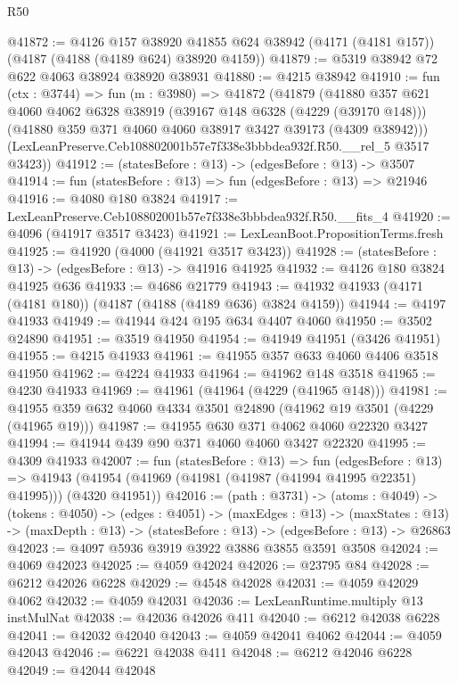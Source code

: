 \begin{lexlean}{R50}
\begin{coremodule}
@41872 := @4126
    @157
    @38920
    @41855
    @624
    @38942
    (@4171 (@4181 @157))
    (@4187 (@4188 (@4189 @624) @38920 @4159))
@41879 := @5319 @38942 @72 @622 @4063 @38924 @38920 @38931
@41880 := @4215 @38942
@41910 := fun (ctx : @3744) =>
  fun (m : @3980) =>
  @41872
    (@41879
      (@41880
        @357
        @621
        @4060
        @4062
        @6328
        @38919
        (@39167 @148 @6328 (@4229 (@39170 @148)))
        (@41880 @359 @371 @4060 @4060 @38917 @3427 @39173 (@4309 @38942)))
      (LexLeanPreserve.Ceb108802001b57e7f338e3bbbdea932f.R50.__rel_5 @3517 @3423))
@41912 := (statesBefore : @13) -> (edgesBefore : @13) -> @3507
@41914 := fun (statesBefore : @13) => fun (edgesBefore : @13) => @21946
@41916 := @4080 @180 @3824
@41917 := LexLeanPreserve.Ceb108802001b57e7f338e3bbbdea932f.R50.__fits_4
@41920 := @4096 (@41917 @3517 @3423)
@41921 := LexLeanBoot.PropositionTerms.fresh
@41925 := @41920 (@4000 (@41921 @3517 @3423))
@41928 := (statesBefore : @13) -> (edgesBefore : @13) -> @41916 @41925
@41932 := @4126 @180 @3824 @41925 @636
@41933 := @4686 @21779
@41943 := @41932 @41933 (@4171 (@4181 @180)) (@4187 (@4188 (@4189 @636) @3824 @4159))
@41944 := @4197 @41933
@41949 := @41944 @424 @195 @634 @4407 @4060
@41950 := @3502 @24890
@41951 := @3519 @41950
@41954 := @41949 @41951 (@3426 @41951)
@41955 := @4215 @41933
@41961 := @41955 @357 @633 @4060 @4406 @3518 @41950
@41962 := @4224 @41933
@41964 := @41962 @148 @3518
@41965 := @4230 @41933
@41969 := @41961 (@41964 (@4229 (@41965 @148)))
@41981 := @41955 @359 @632 @4060 @4334 @3501 @24890 (@41962 @19 @3501 (@4229 (@41965 @19)))
@41987 := @41955 @630 @371 @4062 @4060 @22320 @3427
@41994 := @41944 @439 @90 @371 @4060 @4060 @3427 @22320
@41995 := @4309 @41933
@42007 := fun (statesBefore : @13) =>
  fun (edgesBefore : @13) =>
  @41943 (@41954 (@41969 (@41981 (@41987 (@41994 @41995 @22351) @41995))) (@4320 @41951))
@42016 := (path : @3731) ->
  (atoms : @4049) ->
  (tokens : @4050) ->
  (edges : @4051) ->
  (maxEdges : @13) ->
  (maxStates : @13) -> (maxDepth : @13) -> (statesBefore : @13) -> (edgesBefore : @13) -> @26863
@42023 := @4097 @5936 @3919 @3922 @3886 @3855 @3591 @3508
@42024 := @4069 @42023
@42025 := @4059 @42024
@42026 := @23795 @84
@42028 := @6212 @42026 @6228
@42029 := @4548 @42028
@42031 := @4059 @42029 @4062
@42032 := @4059 @42031
@42036 := LexLeanRuntime.multiply @13 instMulNat
@42038 := @42036 @42026 @411
@42040 := @6212 @42038 @6228
@42041 := @42032 @42040
@42043 := @4059 @42041 @4062
@42044 := @4059 @42043
@42046 := @6221 @42038 @411
@42048 := @6212 @42046 @6228
@42049 := @42044 @42048

\end{coremodule}
\end{lexlean}
